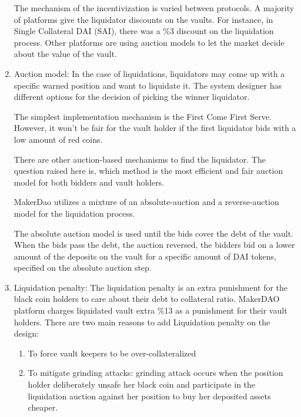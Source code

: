 \documentclass[runningheads]{llncs}
\begin{document}
\begin{enumerate}
The mechanism of the incentivization is varied between protocols. A majority of platforms give the liquidator discounts on the vaults. For instance, in Single Collateral DAI (SAI), there was a \%3 discount on the liquidation process. Other platforms are using auction models to let the market decide about the value of the vault. 
  
  \item Auction model:
In the case of liquidations,  liquidators may come up with a specific warned position and want to liquidate it. The system designer has different options for the decision of picking the winner liquidator.
 
The simplest implementation mechanism is the First Come First Serve. However, it won't be fair for the vault holder if the first liquidator bids with a low amount of red coins.

There are other auction-based mechanisms to find the liquidator. The question raised here is, which method is the most efficient and fair auction model for both bidders and vault holders.

MakerDao utilizes a mixture of an absolute-auction and a reverse-auction model for the liquidation process.

The absolute auction model is used until the bids cover the debt of the vault. When the bids pass the debt, the auction reversed, the bidders bid on a lower amount of the deposits on the vault for a specific amount of DAI tokens, specified on the absolute auction step.
  
  \item Liquidation penalty:
The liquidation penalty is an extra punishment for the black coin holders to care about their debt to collateral ratio.
MakerDAO platform charges liquidated vault extra \%13 as a punishment for their vault holders. There are two main reasons to add Liquidation penalty on the design:

\begin{enumerate}

  \item To force vault keepers to be over-collateralized
  \item To mitigate grinding attacks: grinding attack occurs when the position holder deliberately unsafe her black coin and participate in the liquidation auction against her position to buy her deposited assets cheaper.

\end{enumerate}
\end{enumerate}
\end{document}
